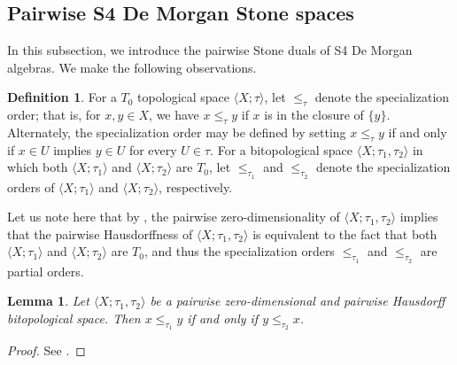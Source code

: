 \documentclass{amsart}
\theoremstyle{plain}
\newtheorem{lemma}[theorem]{Lemma}
\theoremstyle{definition}
\newtheorem{definition}[theorem]{Definition}
\begin{document}
\subsection{Pairwise S4 De Morgan Stone spaces}
In this subsection, we introduce the pairwise Stone duals of S4 De Morgan algebras. We make the following observations. 



 

\begin{definition}
For a $T_0$ topological space $\langle X; \tau \rangle$, let $\leq_\tau$ denote the specialization order; that is, for $x, y \in X$, we have $x \leq_\tau y$ if $x$ is in the closure of $\{y\}$. Alternately, the specialization order may be defined by setting $x\leq_{\tau}y$ if and only if $x\in U$ implies $y\in U$ for every $U\in\tau$. For a bitopological space $\langle X; \tau_1, \tau_2 \rangle$ in which both $\langle X; \tau_1 \rangle$ and $\langle X; \tau_2 \rangle$ are $T_0$, let $\leq_{\tau_1}$ and $\leq_{\tau_2}$ denote the specialization orders of $\langle X; \tau_1 \rangle$ and $\langle X; \tau_2 \rangle$, respectively.
\end{definition}




Let us note here that by \cite[Lemma 2.5]{bezhanishvili}, the pairwise zero-dimensionality of $\langle X; \tau_1, \tau_2 \rangle$ implies that the pairwise Hausdorffness of $\langle X; \tau_1, \tau_2 \rangle$ is equivalent to the fact that both $\langle X; \tau_1 \rangle$ and $\langle X; \tau_2 \rangle$ are $T_0$, and thus the specialization orders $\leq_{\tau_1}$ and $\leq_{\tau_2}$ are partial orders.


\begin{lemma}
    Let $\langle X; \tau_1, \tau_2 \rangle$ be a pairwise zero-dimensional and pairwise Hausdorff bitopological space. 
    Then $x \leq_{\tau_1} y$ if and only if $y \leq_{\tau_2} x$.
\end{lemma}


\begin{proof}
    See \cite[Lemma 3.3]{bezhanishvili}.
\end{proof}
\end{document}
